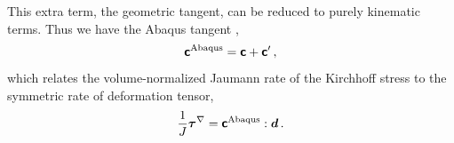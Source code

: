 \documentclass[10pt,letterpaper,oneside]{report}
\newcommand{\ten}[1]{\mbox{\boldmath $#1$}{}}
\newcommand{\tenf}[1]{\mbox{{\sffamily{\bfseries {#1}}}}}
\begin{document}
This extra term, the geometric tangent, can be reduced to purely kinematic terms.  Thus we have the Abaqus tangent \cite{Prot2009,Bower},
\begin{equation}
\tenf{c}^\text{Abaqus} =  \tenf{c} + \tenf{c}' \, , 
\end{equation}
which relates the volume-normalized Jaumann rate of the Kirchhoff stress to the symmetric rate of deformation tensor, 
\begin{equation}
\frac{1}{J} \ten{\tau}^{\nabla } = \tenf{c}^\text{Abaqus} : \ten{d} \, .
\end{equation}
\end{document}
